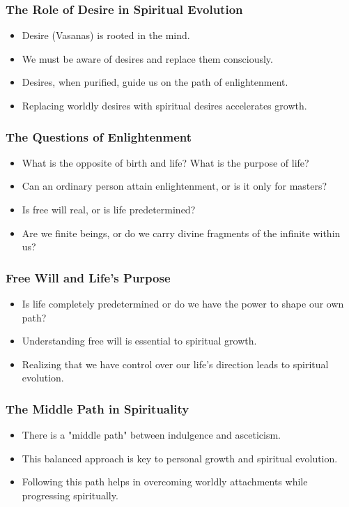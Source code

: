 \begin{frame}\frametitle{The Role of Desire in Spiritual Evolution}
  \begin{itemize}
    \item Desire (Vasanas) is rooted in the mind.
    \item We must be aware of desires and replace them consciously.
    \item Desires, when purified, guide us on the path of enlightenment.
    \item Replacing worldly desires with spiritual desires accelerates growth.
  \end{itemize}
\end{frame}

\begin{frame}\frametitle{The Questions of Enlightenment}
  \begin{itemize}
    \item What is the opposite of birth and life? What is the purpose of life?
    \item Can an ordinary person attain enlightenment, or is it only for masters?
    \item Is free will real, or is life predetermined?
    \item Are we finite beings, or do we carry divine fragments of the infinite within us?
  \end{itemize}
\end{frame}

\begin{frame}\frametitle{Free Will and Life's Purpose}
  \begin{itemize}
    \item Is life completely predetermined or do we have the power to shape our own path?
    \item Understanding free will is essential to spiritual growth.
    \item Realizing that we have control over our life’s direction leads to spiritual evolution.
  \end{itemize}
\end{frame}

\begin{frame}\frametitle{The Middle Path in Spirituality}
  \begin{itemize}
    \item There is a "middle path" between indulgence and asceticism.
    \item This balanced approach is key to personal growth and spiritual evolution.
    \item Following this path helps in overcoming worldly attachments while progressing spiritually.
  \end{itemize}
\end{frame}

